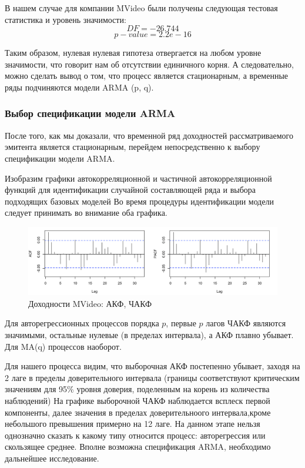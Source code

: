 \documentclass[a4paper,12pt,twoside]{article}
\begin{document}
В нашем случае для компании MVideo были получены следующая тестовая статистика и уровень значимости:
$$ DF = -26.744$$
$$ p-value = 2.2e-16 $$

Таким образом, нулевая нулевая гипотеза отвергается на любом уровне значимости, что говорит нам об отсутствии единичного корня. А следовательно, можно сделать вывод о том, что процесс является стационарным, а временные ряды подчиняются модели  ARMA (p, q).

\subsubsection{Выбор спецификации модели ARMA}

После того, как мы доказали, что временной ряд доходностей рассматриваемого эмитента является стационарным, перейдем  непосредственно к выбору спецификации модели ARMA.

Изобразим графики автокорреляционной и частичной автокорреляционной функций для идентификации случайной составляющей ряда и выбора подходящих базовых моделей
Во время процедуры идентификации модели следует принимать во внимание оба графика.

\begin{figure}[!h]
    \includegraphics[scale = 0.5]{mvideo_02.png}
    \caption{Доходности MVideo: АКФ, ЧАКФ}
    \label{fig:mvideo_02}
\end{figure}


Для авторегрессионных процессов порядка $p$, первые $p$ лагов ЧАКФ являются значимыми, остальные нулевые (в пределах интервала), а АКФ плавно убывает.
Для MA(q) процессов наоборот.

Для нашего процесса видим, что выборочная АКФ постепенно убывает, заходя на 2 лаге в пределы доверительного интервала (границы соответствуют критическим значениям для 95\% уровня доверия, поделенным на корень из количества наблюдений)
На графике выборочной ЧАКФ наблюдается всплеск первой компоненты, далее значения в пределах доверительноого интервала,кроме небольшого превышения примерно на 12 лаге.
На данном этапе нельзя однозначно сказать к какому типу относится процесс: авторегрессия или скользящее среднее.
Вполне возможна спецификация ARMA, необходимо дальнейшее исследование.
\end{document}
